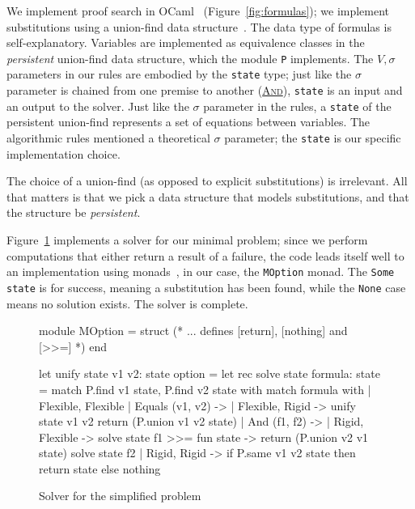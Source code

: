\documentclass{easychair}
\def\li{\lstinline}
\let\TirName\textsc
\renewcommand{\DefTirName}[1]{\hyperlink{#1}{\TirName {#1}}}
\let\Rule\DefTirName
\newcommand{\fref}[1]{Figure~\ref{fig:#1}}
\begin{document}
We implement proof search in OCaml~\cite{ocaml} (\fref{formulas}); we implement substitutions
using a union-find data structure~\cite{cormen-en,tarjan-75}. The data type of formulas
is self-explanatory. Variables are implemented as equivalence classes in the
\emph{persistent} union-find data structure, which the module \li+P+ implements.
The $V, \sigma$ parameters in our rules are embodied by the \li+state+ type; just
like the $\sigma$ parameter is chained from one premise to another (\Rule{And}),
\li+state+ is an input and an output to the solver. Just like the $\sigma$ parameter
in the rules, a \li+state+ of the persistent union-find represents
a set of equations between variables. The algorithmic rules mentioned a
theoretical $\sigma$ parameter; the \li+state+ is our specific implementation
choice.

The choice of a union-find (as opposed to explicit substitutions) is irrelevant.
All that matters is that we pick a data structure that models substitutions, and
that the structure be \emph{persistent}.

\fref{solver} implements a solver for our minimal problem; since we perform
computations that either return a result of a failure, the code leads itself
well to an implementation using
monads~\cite{wadler-comprehending-92,wadler-essence-92}, in our case, the
\li+MOption+ monad. The \li+Some state+ is for success, meaning a substitution
has been found, while the \li+None+ case means no solution exists. The solver is
complete.

\begin{figure}
  \centering
  \begin{ocaml}
module MOption = struct
  (* ... defines [return], [nothing] and [>>=] *)
end

let unify state v1 v2: state option =           let rec solve state formula: state =
  match P.find v1 state, P.find v2 state with     match formula with
  | Flexible, Flexible                            | Equals (v1, v2) ->
  | Flexible, Rigid ->                                unify state v1 v2
      return (P.union v1 v2 state)                | And (f1, f2) ->
  | Rigid, Flexible ->                                solve state f1 >>= fun state ->
      return (P.union v2 v1 state)                    solve state f2
  | Rigid, Rigid ->
      if P.same v1 v2 state then
        return state
      else
        nothing
  \end{ocaml}
  \caption{Solver for the simplified problem}
  \label{fig:solver}
\end{figure}
\end{document}
